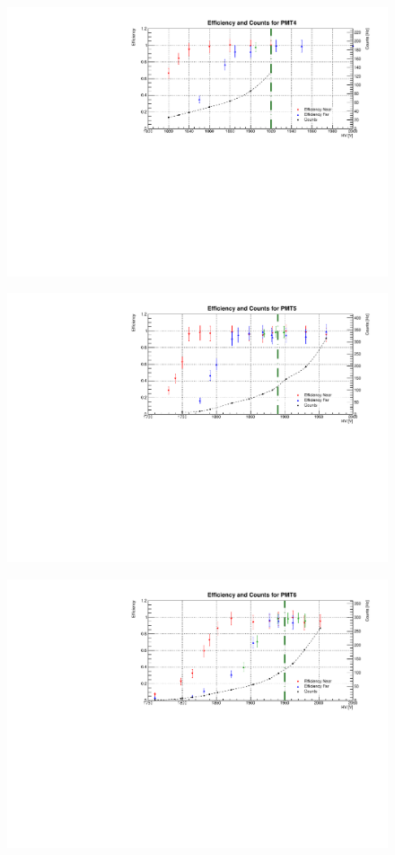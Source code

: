 \begin{figure}[h]
	\centerline{\includegraphics[scale=0.9]{img/eff/eff4.pdf}}
\end{figure}
\begin{figure}[h]
	\centerline{\includegraphics[scale=0.9]{img/eff/eff5.pdf}}
\end{figure}
\begin{figure}[h]
	\centerline{\includegraphics[scale=0.9]{img/eff/eff6.pdf}}
\end{figure}
